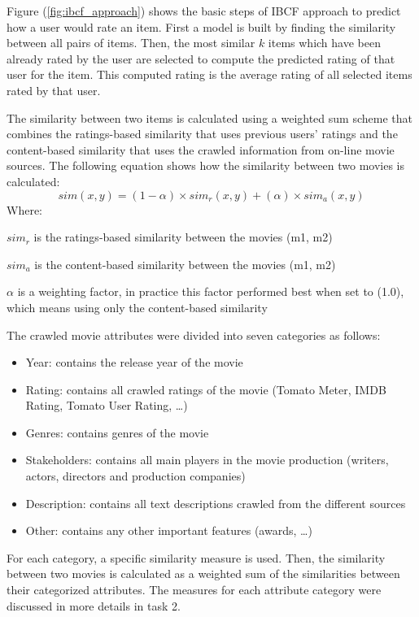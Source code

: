 \documentclass{sigish}
\begin{document}
Figure (\ref{fig:ibcf_approach}) shows the basic steps of IBCF approach to predict how a user would rate an item. First a model is built by finding the similarity between all pairs of items. Then, the most similar $ k $ items which have been already rated by the user are selected to compute the predicted rating of that user for the item. This computed rating is the average rating of all selected items rated by that user.

The similarity between two items is calculated using a weighted sum scheme that combines the ratings-based similarity that uses previous users' ratings and the content-based similarity that uses the crawled information from on-line movie sources. The following equation shows how the similarity between two movies is calculated:
\begin{equation}
sim(x, y) = (1 - \alpha) \times sim_{r}(x, y) + (\alpha) \times sim_{a}(x, y)
\end{equation}
Where:

$ sim_{r} $ is the ratings-based similarity between the movies (m1, m2)

$ sim_{a} $ is the content-based similarity between the movies (m1, m2)

$ \alpha $  is a weighting factor, in practice this factor performed best when set to (1.0), which means using only the content-based similarity

The crawled movie attributes were divided into seven categories as follows:
\begin{itemize}
	\item Year: contains the release year of the movie
	\item Rating: contains all crawled ratings of the movie (Tomato Meter, IMDB Rating, Tomato User Rating, …)
	\item Genres: contains genres of the movie
	\item Stakeholders: contains all main players in the movie production (writers, actors, directors and production companies)
	\item Description: contains all text descriptions crawled from the different sources
	\item Other: contains any other important features (awards, …)
\end{itemize}
For each category, a specific similarity measure is used. Then, the similarity between two movies is calculated as a weighted sum of the similarities between their categorized attributes. The measures for each attribute category were discussed in more details in task 2.
\end{document}

